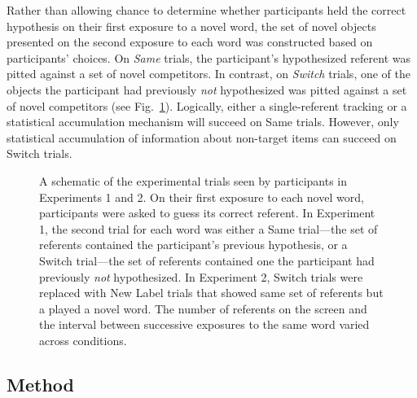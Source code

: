 \documentclass[man,floatsintext]{apa6}
\begin{document}
Rather than allowing chance to determine whether participants held the correct hypothesis on their first exposure to a novel word, the set of novel objects presented on the second exposure to each word was constructed based on participants' choices. On \emph{Same} trials, the participant's hypothesized referent was pitted against a set of novel competitors. In contrast, on \emph{Switch} trials, one of the objects the participant had previously \emph{not} hypothesized was pitted against a set of novel competitors (see Fig.~\ref{fig:design}). Logically, either a single-referent tracking or a statistical accumulation mechanism will succeed on Same trials. However, only statistical accumulation of information about non-target items can  succeed on Switch trials.

\begin{figure}[tb]
	\caption{\label{fig:design} A schematic of the experimental trials seen by participants in Experiments 1 and 2. On their first exposure to each novel word, participants were asked to guess its correct referent. In Experiment 1, the second trial for each word was either a Same trial---the set of referents contained the participant's previous hypothesis, or a Switch trial---the set of referents contained one the participant had previously \emph{not} hypothesized. In Experiment 2, Switch trials were replaced with New Label trials that showed same set of referents but a played a novel word. The number of referents on the screen and the interval between successive exposures to the same word varied across conditions.}
\end{figure}

\subsection{Method}
\end{document}

